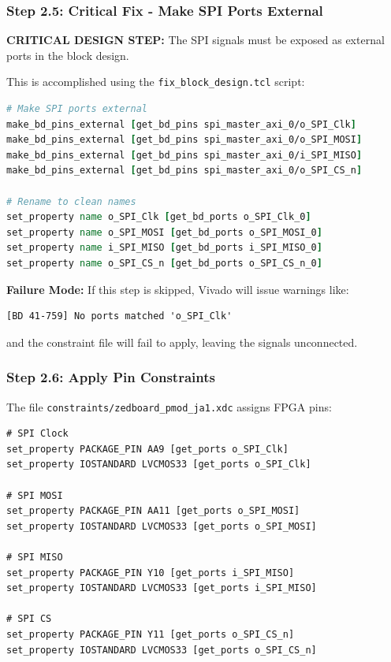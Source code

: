 \documentclass[11pt,a4paper]{article}
\begin{document}
\subsubsection{Step 2.5: Critical Fix - Make SPI Ports External}

\textbf{CRITICAL DESIGN STEP:} The SPI signals must be exposed as external ports in the block design.

This is accomplished using the \texttt{fix\_block\_design.tcl} script:

\begin{lstlisting}[language=tcl, caption=Making Ports External]
# Make SPI ports external
make_bd_pins_external [get_bd_pins spi_master_axi_0/o_SPI_Clk]
make_bd_pins_external [get_bd_pins spi_master_axi_0/o_SPI_MOSI]
make_bd_pins_external [get_bd_pins spi_master_axi_0/i_SPI_MISO]
make_bd_pins_external [get_bd_pins spi_master_axi_0/o_SPI_CS_n]

# Rename to clean names
set_property name o_SPI_Clk [get_bd_ports o_SPI_Clk_0]
set_property name o_SPI_MOSI [get_bd_ports o_SPI_MOSI_0]
set_property name i_SPI_MISO [get_bd_ports i_SPI_MISO_0]
set_property name o_SPI_CS_n [get_bd_ports o_SPI_CS_n_0]
\end{lstlisting}

\textbf{Failure Mode:} If this step is skipped, Vivado will issue warnings like:
\begin{verbatim}
[BD 41-759] No ports matched 'o_SPI_Clk'
\end{verbatim}
and the constraint file will fail to apply, leaving the signals unconnected.

\subsubsection{Step 2.6: Apply Pin Constraints}

The file \texttt{constraints/zedboard\_pmod\_ja1.xdc} assigns FPGA pins:

\begin{lstlisting}[caption=Pin Constraint File Excerpt]
# SPI Clock
set_property PACKAGE_PIN AA9 [get_ports o_SPI_Clk]
set_property IOSTANDARD LVCMOS33 [get_ports o_SPI_Clk]

# SPI MOSI
set_property PACKAGE_PIN AA11 [get_ports o_SPI_MOSI]
set_property IOSTANDARD LVCMOS33 [get_ports o_SPI_MOSI]

# SPI MISO
set_property PACKAGE_PIN Y10 [get_ports i_SPI_MISO]
set_property IOSTANDARD LVCMOS33 [get_ports i_SPI_MISO]

# SPI CS
set_property PACKAGE_PIN Y11 [get_ports o_SPI_CS_n]
set_property IOSTANDARD LVCMOS33 [get_ports o_SPI_CS_n]
\end{lstlisting}
\end{document}
